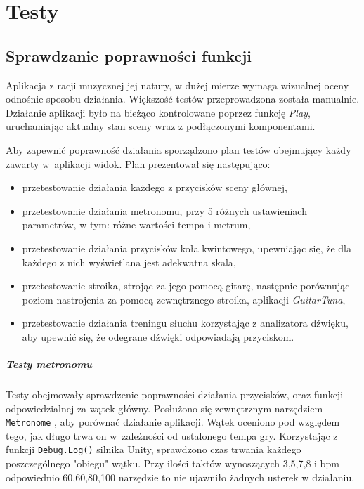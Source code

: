 \chapter{Testy}

\section{Sprawdzanie poprawności funkcji}

Aplikacja z racji muzycznej jej natury, w dużej mierze wymaga wizualnej oceny odnośnie sposobu działania. Większość testów przeprowadzona została manualnie. Działanie aplikacji było na bieżąco kontrolowane poprzez funkcję \emph{Play}, uruchamiając aktualny stan sceny wraz z podłączonymi komponentami.

Aby zapewnić poprawność działania sporządzono plan testów obejmujący każdy zawarty w~aplikacji widok. Plan prezentował się następująco:
\begin{itemize}
    \item przetestowanie działania każdego z przycisków sceny głównej,
    \item przetestowanie działania metronomu, przy 5 różnych ustawieniach parametrów, w tym: różne wartości tempa i metrum,
    \item przetestowanie działania przycisków koła kwintowego, upewniając się, że dla każdego z nich wyświetlana jest adekwatna skala,
    \item przetestowanie stroika, strojąc za jego pomocą gitarę, następnie porównując poziom nastrojenia za pomocą zewnętrznego stroika, aplikacji \emph{GuitarTuna},
    \item przetestowanie działania treningu słuchu korzystając z analizatora dźwięku, aby upewnić się, że odegrane dźwięki odpowiadają przyciskom.
\end{itemize} 

\paragraph{Testy metronomu}

Testy obejmowały sprawdzenie poprawności działania przycisków, oraz funkcji odpowiedzialnej za wątek główny. Posłużono się zewnętrznym narzędziem \texttt{Metronome} \cite{Musicca}, aby porównać działanie aplikacji. Wątek oceniono pod względem tego, jak długo trwa on w~zależności od ustalonego tempa gry. Korzystając z funkcji \texttt{Debug.Log()} silnika Unity, sprawdzono czas trwania każdego poszczególnego "obiegu" wątku. Przy ilości taktów wynoszących 3,5,7,8 i bpm odpowiednio 60,60,80,100 narzędzie to nie ujawniło żadnych usterek w działaniu.

